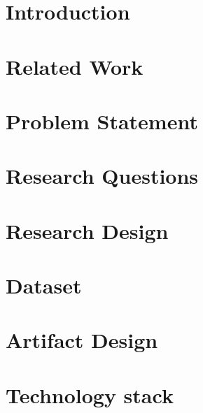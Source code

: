 \documentclass{beamer}
\begin{document}

\section{Introduction}

%
%
\section{Related Work}

%
\section{Problem Statement}

%
\section{Research Questions}

%
%
\section{Research Design}

%
\section{Dataset}

%
\section{Artifact Design}

%
\section{Technology stack}

%
\end{document}

